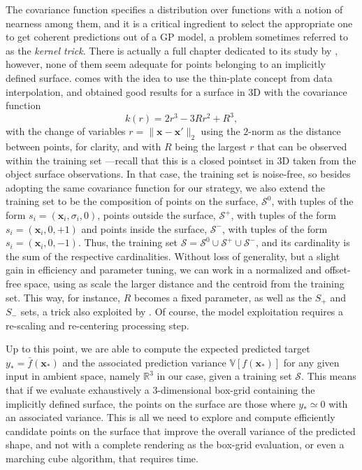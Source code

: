 The covariance function specifies a distribution over functions with a notion of nearness among them, and it is a critical ingredient to select the appropriate one to get coherent predictions out of a GP model, a problem sometimes referred to as the \emph{kernel trick}. There is actually a full chapter dedicated to its study by \citet[see Ch. 4]{Rasmussen2006Gaussian}, however, none of them seem adequate for points belonging to an implicitly defined surface. \citet{Williams2007Gaussian} comes with the idea to use the thin-plate concept from data interpolation, and obtained good results for a surface in 3D with the covariance function
\begin{equation}
k(r) = 2r^{3} - 3Rr^2 + R^3,
\end{equation}
with the change of variables $r = \| \mathbf{x} - \mathbf{x}' \|_2$ using the $2$-norm as the distance between points, for clarity, and with $R$ being the largest $r$ that can be observed within the training set ---recall that this is a closed pointset in 3D taken from the object surface observations. In that case, the training set is noise-free, so besides adopting the same covariance function for our strategy, we also extend the training set to be the composition of points on the surface, $\mathcal{S}^0$, with tuples of the form $s_i = (\mathbf{x}_i, \sigma_i, 0)$, points outside the surface, $\mathcal{S}^+$, with tuples of the form $s_i = (\mathbf{x}_i, 0, +1)$ and points inside the surface, $\mathcal{S}^-$, with tuples of the form $s_i = (\mathbf{x}_i, 0, -1)$. Thus, the training set $\mathcal{S} = \mathcal{S}^0 \cup \mathcal{S}^+ \cup \mathcal{S}^-$, and its cardinality is the sum of the respective cardinalities. Without loss of generality, but a slight gain in efficiency and parameter tuning, we can work in a normalized and offset-free space, using as scale the larger distance and the centroid from the training set. This way, for instance, $R$ becomes a fixed parameter, as well as the $S_+$ and $S_-$ sets, a trick also exploited by \citet{Li2016Dexterous}. Of course, the model exploitation requires a re-scaling and re-centering processing step.

Up to this point, we are able to compute the expected predicted target $y_* = \bar{f}(\mathbf{x}_*)$ and the associated prediction variance $\mathbb{V}[f(\mathbf{x}_*)]$ for any given input in ambient space, namely $\mathbb{R}^3$ in our case, given a training set $\mathcal{S}$. This means that if we evaluate exhaustively a $3$-dimensional box-grid containing the implicitly defined surface, the points on the surface are those where $y_* \simeq 0$ with an associated variance. This is all we need to explore and compute efficiently candidate points on the surface that improve the overall variance of the predicted shape, and not with a complete rendering as the box-grid evaluation, or even a marching cube algorithm, that requires time.

